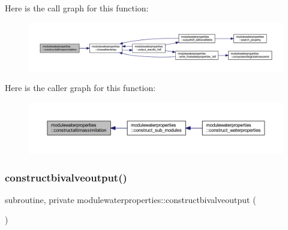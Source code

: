 Here is the call graph for this function\+:\nopagebreak
\begin{figure}[H]
\begin{center}
\leavevmode
\includegraphics[width=350pt]{namespacemodulewaterproperties_ac1893e82a87294024a1db3f0c2a7a842_cgraph}
\end{center}
\end{figure}
Here is the caller graph for this function\+:\nopagebreak
\begin{figure}[H]
\begin{center}
\leavevmode
\includegraphics[width=350pt]{namespacemodulewaterproperties_ac1893e82a87294024a1db3f0c2a7a842_icgraph}
\end{center}
\end{figure}
\mbox{\label{namespacemodulewaterproperties_abe78da28c4264216e9c5f3d2e8a558f4}} 
\subsubsection{\texorpdfstring{constructbivalveoutput()}{constructbivalveoutput()}}
{\footnotesize\ttfamily subroutine, private modulewaterproperties\+::constructbivalveoutput (\begin{DoxyParamCaption}{ }\end{DoxyParamCaption})\hspace{0.3cm}{\ttfamily [private]}}


